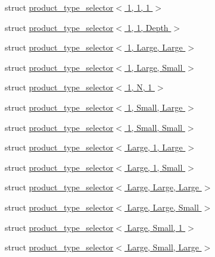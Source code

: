\begin{DoxyCompactItemize}
\item 
struct \hyperlink{struct_eigen_1_1internal_1_1product__type__selector_3_011_00_011_00_011_01_4}{product\+\_\+type\+\_\+selector$<$ 1, 1, 1 $>$}
\item 
struct \hyperlink{struct_eigen_1_1internal_1_1product__type__selector_3_011_00_011_00_01_depth_01_4}{product\+\_\+type\+\_\+selector$<$ 1, 1, Depth $>$}
\item 
struct \hyperlink{struct_eigen_1_1internal_1_1product__type__selector_3_011_00_01_large_00_01_large_01_4}{product\+\_\+type\+\_\+selector$<$ 1, Large, Large $>$}
\item 
struct \hyperlink{struct_eigen_1_1internal_1_1product__type__selector_3_011_00_01_large_00_01_small_01_4}{product\+\_\+type\+\_\+selector$<$ 1, Large, Small $>$}
\item 
struct \hyperlink{struct_eigen_1_1internal_1_1product__type__selector_3_011_00_01_n_00_011_01_4}{product\+\_\+type\+\_\+selector$<$ 1, N, 1 $>$}
\item 
struct \hyperlink{struct_eigen_1_1internal_1_1product__type__selector_3_011_00_01_small_00_01_large_01_4}{product\+\_\+type\+\_\+selector$<$ 1, Small, Large $>$}
\item 
struct \hyperlink{struct_eigen_1_1internal_1_1product__type__selector_3_011_00_01_small_00_01_small_01_4}{product\+\_\+type\+\_\+selector$<$ 1, Small, Small $>$}
\item 
struct \hyperlink{struct_eigen_1_1internal_1_1product__type__selector_3_01_large_00_011_00_01_large_01_4}{product\+\_\+type\+\_\+selector$<$ Large, 1, Large $>$}
\item 
struct \hyperlink{struct_eigen_1_1internal_1_1product__type__selector_3_01_large_00_011_00_01_small_01_4}{product\+\_\+type\+\_\+selector$<$ Large, 1, Small $>$}
\item 
struct \hyperlink{struct_eigen_1_1internal_1_1product__type__selector_3_01_large_00_01_large_00_01_large_01_4}{product\+\_\+type\+\_\+selector$<$ Large, Large, Large $>$}
\item 
struct \hyperlink{struct_eigen_1_1internal_1_1product__type__selector_3_01_large_00_01_large_00_01_small_01_4}{product\+\_\+type\+\_\+selector$<$ Large, Large, Small $>$}
\item 
struct \hyperlink{struct_eigen_1_1internal_1_1product__type__selector_3_01_large_00_01_small_00_011_01_4}{product\+\_\+type\+\_\+selector$<$ Large, Small, 1 $>$}
\item 
struct \hyperlink{struct_eigen_1_1internal_1_1product__type__selector_3_01_large_00_01_small_00_01_large_01_4}{product\+\_\+type\+\_\+selector$<$ Large, Small, Large $>$}

\end{DoxyCompactItemize}
